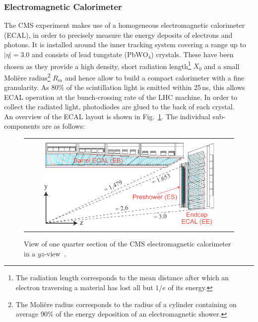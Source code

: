 \subsubsection*{Electromagnetic Calorimeter}
\label{subsec:cms_ecal}
The CMS experiment makes use of a homogeneous electromagnetic calorimeter (ECAL), in order to precisely measure the energy deposits of electrons and photons. It is installed around the inner tracking system covering a range up to $|\eta| = 3.0$ and consists of lead tungstate (PbW$\mathrm{O}_4$) crystals. These have been chosen as they provide a high density, short radiation length\footnote{The radiation length corresponds to the mean distance after which an electron traversing a material has lost all but $1/e$ of its energy.} $X_0$ and a small Moli\`{e}re radius\footnote{The Moli\`{e}re radius corresponds to the radius of a cylinder containing on average 90\% of the energy deposition of an electromagnetic shower.} $R_m$ and hence allow to build a compact calorimeter with a fine granularity. As 80\% of the scintillation light is emitted within 25\,ns, this allows ECAL operation at the bunch-crossing rate of the LHC machine. In order to collect the radiated light, photodiodes are glued to the back of each crystal.\\
An overview of the ECAL layout is shown in Fig.~\ref{fig:CMS_ecal}. The individual sub-components are as follows:
\begin{figure}[!tp]
  \centering
  \begin{tabular}{c}
    \includegraphics[width=0.85\textwidth]{figures/Figures_Experimental_Apparatus_ECALRapidity.png}
  \end{tabular}
  \caption{View of one quarter section of the CMS electromagnetic calorimeter in a $yz$-view~\cite{bib:cmsptdr1}.}
  \label{fig:CMS_ecal}
\end{figure}
